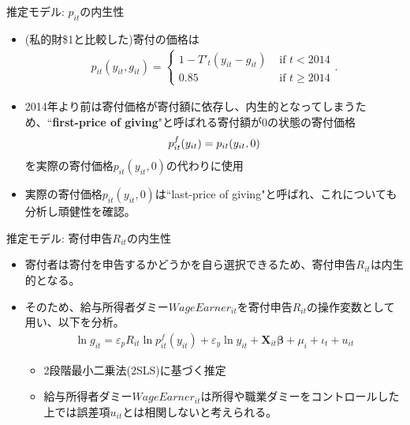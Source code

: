 \documentclass[dvipdfmx,10pt]{beamer}
\begin{document}
\begin{frame}{推定モデル: $p_{it}$の内生性}
	\begin{itemize}
		\item (私的財\$1と比較した)寄付の価格は
		\begin{align}
			p_{it}(y_{it}, g_{it})=\begin{cases}
			1-T'_t(y_{it}-g_{it})&\text{ if }t<2014\\
			0.85&\text{ if }t\ge2014
			\end{cases}
			\tag{6'}.
		\end{align}
		\item 2014年より前は寄付価格が寄付額に依存し、内生的となってしまうため、``\textbf{first-price of giving}"と呼ばれる寄付額が0の状態の寄付価格
		\begin{align}
			p_{it}^f(y_{it})=p_{it}(y_{it},0)\notag
		\end{align}
		を実際の寄付価格$p_{it}(y_{it},0)$の代わりに使用
		\item 実際の寄付価格$p_{it}(y_{it},0)$は``last-price of giving"と呼ばれ、これについても分析し頑健性を確認。
	\end{itemize}
\end{frame}

\begin{frame}{推定モデル: 寄付申告$R_{it}$の内生性}
	\begin{itemize}
		\item 寄付者は寄付を申告するかどうかを自ら選択できるため、寄付申告$R_{it}$は内生的となる。
		\item そのため、給与所得者ダミー$WageEarner_{it}$を寄付申告$R_{it}$の操作変数として用い、以下を分析。
		\begin{align}
			\ln g_{it} = \varepsilon_pR_{it} \ln p_{it}^f(y_{it}) + \varepsilon_y \ln y_{it} + \bm{X}_{it}\bm{\beta} + \mu_i + \iota_t + u_{it}\tag{7}
		\end{align} 
	 	\begin{itemize}
	 		\item 2段階最小二乗法(2SLS)に基づく推定
			\item 給与所得者ダミー$WageEarner_{it}$は所得や職業ダミーをコントロールした上では誤差項$u_{it}$とは相関しないと考えられる。
		\end{itemize}
	\end{itemize}
\end{frame}
\end{document}
